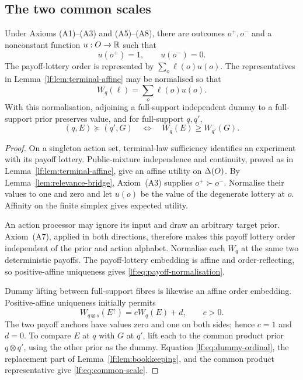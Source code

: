 \subsection{The two common scales}

\begin{lemma}\label{lf:lem:material-scale}
Under Axioms \textup{(A1)--(A3)} and
\textup{(A5)--(A8)}, there are outcomes $o^+,o^-$ and a
nonconstant function $u:O\to\mathbb R$ such that
\[
u(o^+)=1,
\qquad
u(o^-)=0.
\]
The payoff-lottery order is represented by $\sum_o\ell(o)u(o)$.  The
representatives in Lemma~\ref{lf:lem:terminal-affine} may be normalised so that
\begin{equation}
W_q(\ell)=\sum_o\ell(o)u(o).
\label{lf:eq:payoff-normalisation}
\end{equation}
With this normalisation, adjoining a full-support independent dummy to a
full-support prior preserves value, and for full-support $q,q'$,
\begin{equation}
(q,E)\succeq(q',G)
\quad\Longleftrightarrow\quad
W_q(E)\ge W_{q'}(G).
\label{lf:eq:common-scale}
\end{equation}
\end{lemma}

\begin{proof}
On a singleton action set, terminal-law sufficiency identifies an experiment
with its payoff lottery.  Public-mixture independence and continuity, proved as
in Lemma~\ref{lf:lem:terminal-affine}, give an affine utility on $\Delta(O)$.
By Lemma~\ref{lem:relevance-bridge}, Axiom~\textup{(A3)} supplies
$o^+\succ o^-$.  Normalise their values to one
and zero and let $u(o)$ be the value of the degenerate lottery at $o$.
Affinity on the finite simplex gives expected utility.

An action processor may ignore its input and draw an arbitrary target prior.
Axiom~\textup{(A7)}, applied in both directions, therefore makes this payoff
lottery order independent of the prior and action alphabet.  Normalise each
$W_q$ at the same two deterministic payoffs.  The payoff-lottery embedding is
affine and order-reflecting, so positive-affine uniqueness gives
\eqref{lf:eq:payoff-normalisation}.

Dummy lifting between full-support fibres is likewise an affine order
embedding.  Positive-affine uniqueness initially permits
\[
W_{q\otimes s}(E^\uparrow)=cW_q(E)+d,
\qquad c>0.
\]
The two payoff anchors have values zero and one on both sides; hence $c=1$ and
$d=0$.  To compare $E$ at $q$ with $G$ at $q'$, lift each to the common product
prior $q\otimes q'$, using the other prior as the dummy.  Equation
\eqref{lf:eq:dummy-ordinal}, the replacement part of
Lemma~\ref{lf:lem:bookkeeping}, and the common product representative give
\eqref{lf:eq:common-scale}.
\end{proof}

